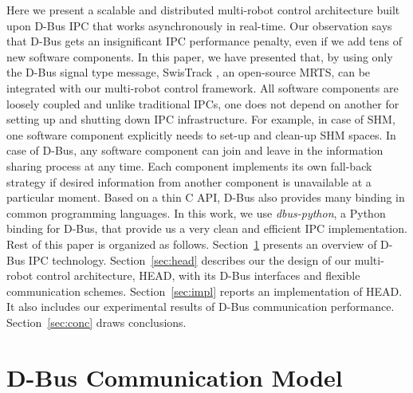 \documentclass{ifacconf}
\begin{document}
Here we present a scalable and distributed multi-robot control architecture built upon D-Bus IPC that works asynchronously in real-time. Our observation says that D-Bus gets an insignificant IPC performance penalty, even if we add tens of new software components. In this paper, we have presented that, by using only the D-Bus signal type message, SwisTrack \citep{Lochmatter+2008}, an open-source MRTS, can be integrated with our multi-robot control framework. All software components are loosely coupled and unlike traditional IPCs, one does not depend on another for setting up and shutting down IPC infrastructure. For example, in case of SHM, one software component explicitly needs to set-up and clean-up SHM spaces. In case of D-Bus, any software component can join and leave in the information sharing process at any time. Each component implements its own fall-back strategy if desired information from another component is unavailable at a particular moment. Based on a thin C API, D-Bus also provides many binding in common programming languages. In this work, we use {\em dbus-python}, a Python binding for D-Bus, that provide us a very clean and efficient IPC implementation.\\
Rest of this paper is organized as follows. Section~\ref{sec:dbus} presents an overview of D-Bus IPC technology.  Section~\ref{sec:head} describes our the design of our multi-robot control architecture, HEAD, with its D-Bus interfaces and flexible communication schemes.  Section~\ref{sec:impl} reports an implementation of HEAD. It also includes  our experimental results of D-Bus communication performance. Section~\ref{sec:conc} draws conclusions.
\section{D-Bus Communication Model}
\label{sec:dbus}
\end{document}
